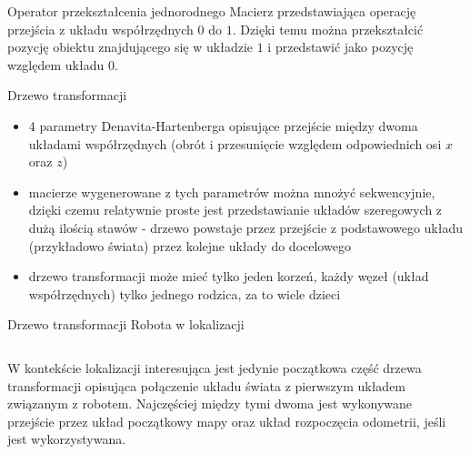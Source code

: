 
\begin{frame}
{Operator przekształcenia jednorodnego}
Macierz przedstawiająca operację przejścia z układu współrzędnych $0$ do $1$.
Dzięki temu można przekształcić pozycję obiektu znajdującego się w układzie $1$ i przedstawić jako pozycję względem układu $0$.

\end{frame}

\begin{frame}
{Drzewo transformacji}
	\begin{itemize}
		\item 4 parametry Denavita-Hartenberga opisujące przejście między dwoma układami współrzędnych (obrót i przesunięcie względem odpowiednich osi $x$ oraz $z$)
		\item macierze wygenerowane z tych parametrów można mnożyć sekwencyjnie, dzięki czemu relatywnie proste jest przedstawianie układów szeregowych z dużą ilością stawów - drzewo powstaje przez przejście z podstawowego układu (przykładowo świata) przez kolejne układy do docelowego
		\item drzewo transformacji może mieć tylko jeden korzeń, każdy węzeł (układ współrzędnych) tylko jednego rodzica, za to wiele dzieci
	\end{itemize}
	
\end{frame}

\begin{frame}
{Drzewo transformacji Robota w lokalizacji}
	\begin{columns}
		\begin{column}{0.5\textwidth}
				W kontekście lokalizacji interesująca jest jedynie początkowa część drzewa transformacji opisująca połączenie układu świata z pierwszym układem związanym z robotem.
	Najczęściej między tymi dwoma jest wykonywane przejście przez układ początkowy mapy oraz układ rozpoczęcia odometrii, jeśli jest wykorzystywana.
		\end{column}
		\begin{column}{0.5\textwidth}  %
		\end{column}
	\end{columns}
\end{frame}

